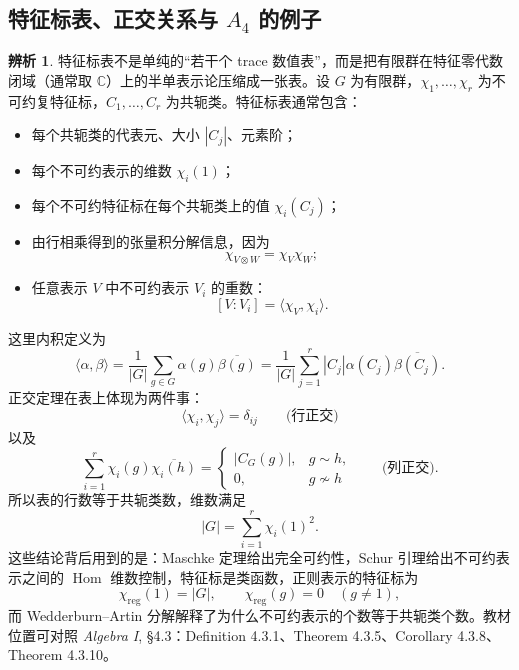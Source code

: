 \documentclass[a4paper]{ctexart}
\theoremstyle{definition}
\theoremstyle{analysis}
\newtheorem{remark}{辨析}[section]
\theoremstyle{plain}
\begin{document}
\subsection{\texorpdfstring{特征标表、正交关系与 \(A_4\) 的例子}{特征标表、正交关系与 A4 的例子}}\label{subsec:character-table-a4}

\begin{remark}
\label{rem:character-table-information}
特征标表不是单纯的“若干个 trace 数值表”，而是把有限群在特征零代数闭域（通常取 \(\mathbb C\)）上的半单表示论压缩成一张表。设 \(G\) 为有限群，\(\chi_1,\dots,\chi_r\) 为不可约复特征标，\(C_1,\dots,C_r\) 为共轭类。特征标表通常包含：
\begin{itemize}
  \item 每个共轭类的代表元、大小 \(|C_j|\)、元素阶；
  \item 每个不可约表示的维数 \(\chi_i(1)\)；
  \item 每个不可约特征标在每个共轭类上的值 \(\chi_i(C_j)\)；
  \item 由行相乘得到的张量积分解信息，因为
  \[
    \chi_{V\otimes W}=\chi_V\chi_W;
  \]
  \item 任意表示 \(V\) 中不可约表示 \(V_i\) 的重数：
  \[
    [V:V_i]=\langle \chi_V,\chi_i\rangle.
  \]
\end{itemize}

这里内积定义为
\[
  \langle \alpha,\beta\rangle
  =
  \frac1{|G|}\sum_{g\in G}\alpha(g)\overline{\beta(g)}
  =
  \frac1{|G|}\sum_{j=1}^{r}|C_j|\alpha(C_j)\overline{\beta(C_j)}.
\]
正交定理在表上体现为两件事：
\[
  \langle \chi_i,\chi_j\rangle=\delta_{ij}
  \qquad\text{(行正交)}
\]
以及
\[
  \sum_{i=1}^{r}\chi_i(g)\overline{\chi_i(h)}
  =
  \begin{cases}
    |C_G(g)|,& g\sim h,\\
    0,& g\not\sim h
  \end{cases}
  \qquad\text{(列正交).}
\]
所以表的行数等于共轭类数，维数满足
\[
  |G|=\sum_{i=1}^r \chi_i(1)^2.
\]
这些结论背后用到的是：Maschke 定理给出完全可约性，Schur 引理给出不可约表示之间的 \(\operatorname{Hom}\) 维数控制，特征标是类函数，正则表示的特征标为
\[
  \chi_{\mathrm{reg}}(1)=|G|,\qquad
  \chi_{\mathrm{reg}}(g)=0\quad(g\neq 1),
\]
而 Wedderburn--Artin 分解解释了为什么不可约表示的个数等于共轭类个数。教材位置可对照 \textit{Algebra I}, \S 4.3：Definition 4.3.1、Theorem 4.3.5、Corollary 4.3.8、Theorem 4.3.10。
\end{remark}
\end{document}

